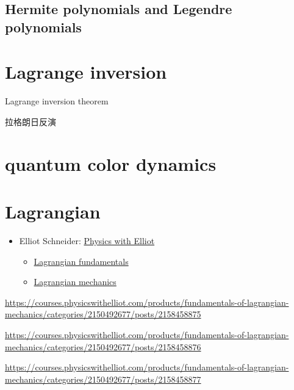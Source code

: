 \documentclass[
]{book}
\providecommand{\tightlist}{%
  \setlength{\itemsep}{0pt}\setlength{\parskip}{0pt}}
\theoremstyle{definition}
\theoremstyle{definition}
\theoremstyle{definition}
\theoremstyle{definition}
\theoremstyle{remark}
\begin{document}
\section{Hermite polynomials and Legendre polynomials}\label{hermite-polynomials-and-legendre-polynomials}

\chapter{Lagrange inversion}\label{lagrange-inversion}

Lagrange inversion theorem

\begin{CJK}{UTF8}{bsmi}
拉格朗日反演
\end{CJK}

\chapter{quantum color dynamics}\label{quantum-color-dynamics}

\chapter{Lagrangian}\label{lagrangian}

\begin{itemize}
\tightlist
\item
  Elliot Schneider: \href{https://www.youtube.com/@PhysicswithElliot/playlists}{Physics with Elliot}

  \begin{itemize}
  \tightlist
  \item
    \href{https://courses.physicswithelliot.com/products/fundamentals-of-lagrangian-mechanics}{Lagrangian fundamentals}
  \item
    \href{https://www.youtube.com/playlist?list=PL-IZN8QRUw-xRsoJPtXBlJyWlWrjVEF0x}{Lagrangian mechanics}
  \end{itemize}
\end{itemize}

\url{https://courses.physicswithelliot.com/products/fundamentals-of-lagrangian-mechanics/categories/2150492677/posts/2158458875}

\url{https://courses.physicswithelliot.com/products/fundamentals-of-lagrangian-mechanics/categories/2150492677/posts/2158458876}

\url{https://courses.physicswithelliot.com/products/fundamentals-of-lagrangian-mechanics/categories/2150492677/posts/2158458877}
\end{document}
